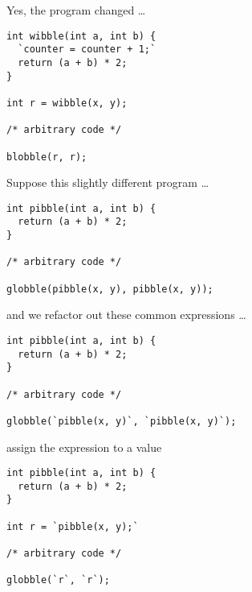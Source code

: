 \begin{frame}[fragile]
\begin{block}{Yes, the program changed \ldots}
\begin{lstlisting}[style=java]
int wibble(int a, int b) {
  `counter = counter + 1;`
  return (a + b) * 2;
}

int r = wibble(x, y);

/* arbitrary code */

blobble(r, r);
\end{lstlisting}
\end{block}
\end{frame}

\begin{frame}[fragile]
\begin{block}{Suppose this slightly different program \ldots}
\begin{lstlisting}[style=java]
int pibble(int a, int b) {
  return (a + b) * 2;
}

/* arbitrary code */

globble(pibble(x, y), pibble(x, y));
\end{lstlisting}
\end{block}
\end{frame}

\begin{frame}[fragile]
\begin{block}{and we refactor out these common expressions \ldots}
\begin{lstlisting}[style=java]
int pibble(int a, int b) {
  return (a + b) * 2;
}

/* arbitrary code */

globble(`pibble(x, y)`, `pibble(x, y)`);
\end{lstlisting}
\end{block}
\end{frame}

\begin{frame}[fragile]
\begin{block}{assign the expression to a value}
\begin{lstlisting}[style=java]
int pibble(int a, int b) {
  return (a + b) * 2;
}

int r = `pibble(x, y);`

/* arbitrary code */

globble(`r`, `r`);
\end{lstlisting}
\end{block}
\end{frame}

